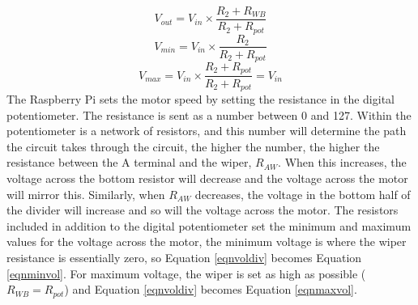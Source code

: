 \documentclass[twoside,a4]{report}
\begin{document}
	\begin{equation}
		V_{out} = V_{in}\times \frac{R_2 + R_{WB}}{R_2 + R_{pot}}
		\label{eqnvoldiv}
	\end{equation}\newline
	\begin{equation}
		V_{min} = V_{in}\times \frac{R_2}{R_2 + R_{pot}}
		\label{eqnminvol}
	\end{equation}\newline
	\begin{equation}
		V_{max} = V_{in}\times \frac{R_2 + R_{pot}}{R_2 + R_{pot}} = V_{in}
		\label{eqnmaxvol}
	\end{equation}\newline \noindent
	The Raspberry Pi sets the motor speed by setting the resistance in the digital potentiometer. The resistance is sent as a number between 0 and 127. Within the potentiometer is a network of resistors, and this number will determine the path the circuit takes through the circuit, the higher the number, the higher the resistance between the A terminal and the wiper, \(R_{AW}\). When this increases, the voltage across the bottom resistor will decrease and the voltage across the motor will mirror this. Similarly, when \(R_{AW}\) decreases, the voltage in the bottom half of the divider will increase and so will the voltage across the motor. The resistors included in addition to the digital potentiometer set the minimum and maximum values for the voltage across the motor, the minimum voltage is where the wiper resistance is essentially zero, so Equation \ref{eqnvoldiv} becomes Equation \ref{eqnminvol}. For maximum voltage, the wiper is set as high as possible (\(R_{WB} = R_{pot}\)) and Equation \ref{eqnvoldiv} becomes Equation \ref{eqnmaxvol}. \newline
\end{document}
